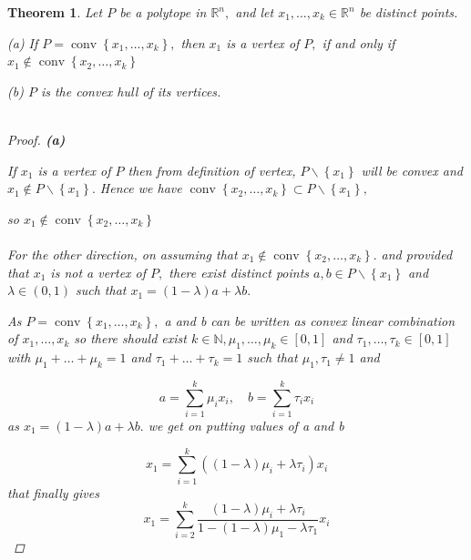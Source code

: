 \documentclass[oneside]{book}
\newtheorem{theorem}{Theorem}[section]
\begin{document}
	
	\begin{theorem}
		\label{t:6}
		Let $P$ be a polytope in $\mathbb{R}^{n},$ and let $x_{1}, \ldots, x_{k} \in \mathbb{R}^{n}$ be distinct points.\par
		(a) If $P=\operatorname{conv}\left\{x_{1}, \ldots, x_{k}\right\},$ then $x_{1}$ is a vertex of $P,$ if and only if $x_{1} \notin \operatorname{conv}\left\{x_{2}, \ldots, x_{k}\right\}$ \par
		(b) $P$ is the convex hull of its vertices. \\\\
		
		\begin{proof}
			
			\textbf{(a)}  \par 
			
			
			If  $x_{1}$ is a vertex of $P $ then  from definition of vertex, $P \backslash\left\{x_{1}\right\}$ will be convex and $x_{1} \notin P \backslash\left\{x_{1}\right\} .$ Hence we have  $\operatorname{conv}\left\{x_{2}, \ldots, x_{k}\right\} \subset P \backslash\left\{x_{1}\right\},$ 
			\par 
			so  $x_{1} \notin \operatorname{conv}\left\{x_{2}, \ldots, x_{k}\right\}$ \\\\
			For the other direction, on assuming that $x_{1} \notin \operatorname{conv}\left\{x_{2}, \ldots, x_{k}\right\} .$ and provided that  $x_{1}$ is not a vertex of $P,$ there exist distinct points $a, b \in P \backslash\left\{x_{1}\right\}$ and $\lambda \in(0,1)$ such that $x_{1}=(1-\lambda) a+\lambda b .$ 
			
			As  $P=\operatorname{conv}\left\{x_{1}, \ldots, x_{k}\right\},$ a and b can be written as convex linear combination of $x_{1},\ldots ,x_{k} $   so there should exist $k \in \mathbb{N}, \mu_{1}, \ldots, \mu_{k} \in[0,1]$ and $\tau_{1}, \ldots, \tau_{k} \in[0,1]$ with $\mu_{1}+\ldots+\mu_{k}=1$ and $\tau_{1}+\ldots+\tau_{k}=1$
			such that $\mu_{1}, \tau_{1} \neq 1$ and \par
			\begin{equation}
			\label{eq37}
			a=\sum_{i=1}^{k} \mu_{i} x_{i}, \quad b=\sum_{i=1}^{k} \tau_{i} x_{i}
			\end{equation}  
			as $x_{1}=(1-\lambda) a+\lambda b .$ we get on putting values of a and b 
			
			\begin{equation} 
			\label{eq38}
			x_{1}=\sum_{i=1}^{k}\left((1-\lambda) \mu_{i}+\lambda \tau_{i}\right) x_{i}
			\end{equation}
			that finally gives 
			\begin{equation} 
			\label{eq39}
			x_{1}=\sum_{i=2}^{k} \frac{(1-\lambda) \mu_{i}+\lambda \tau_{i}}{1-(1-\lambda) \mu_{1}-\lambda \tau_{1}} x_{i}
			\end{equation}
			

\end{proof}
\end{theorem}
\end{document}
